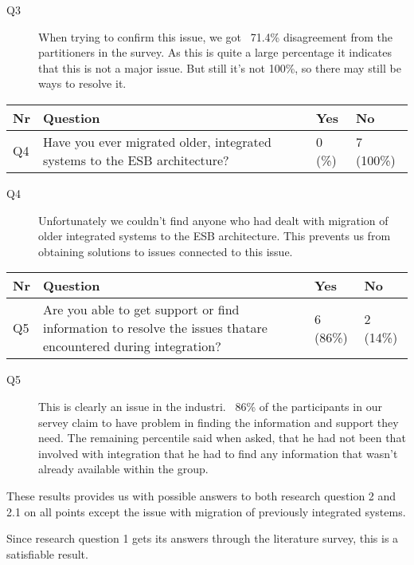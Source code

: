 \documentclass{llncs}
\begin{document}
\begin{description}
\item[Q3] When trying to confirm this issue, we got ~71.4\% disagreement from the partitioners in the survey. As this is quite a large percentage it indicates that this is not a major issue. But still it’s not 100\%, so there may still be ways to resolve it.
\end{description}

\begin{tabular}{ | l | p{9cm} | l | l |}
\hline
Nr & Question & Yes & No \\ \hline
Q4 & Have you ever migrated older, integrated systems to the ESB architecture? & 0 (\%) & 7 (100\%) \\ \hline
\end{tabular}

\begin{description}
\item[Q4]  Unfortunately we couldn’t find anyone who had dealt with migration of older integrated systems to the ESB architecture. This prevents us from obtaining solutions to issues connected to this issue.
\end{description}

\begin{tabular}{ | l | p{9cm} | l | l |}
\hline
Nr & Question & Yes & No\\ \hline
Q5 & Are you able to get support or find information to resolve the issues thatare encountered during integration? & 6 (86\%) & 2 (14\%)\\ \hline
\end{tabular}

\begin{description}
\item[Q5] This is clearly an issue in the industri. ~86\% of the participants in our servey claim to have problem in finding the information and support they need. The remaining percentile said when asked, that he had not been that involved with integration that he had to find any information that wasn't already available within the group.
\end{description}

These results provides us with possible answers to both research question 2 and 2.1 on all points except the issue with migration of previously integrated systems.

Since research question 1 gets its answers through the literature survey, this is a satisfiable result.
\end{document}

